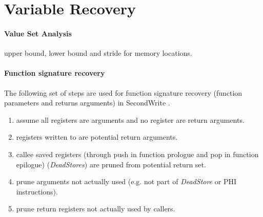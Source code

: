 
\section{Variable Recovery}


\paragraph{Value Set Analysis}


upper bound, lower bound and stride for memory locations.

\paragraph{Function signature recovery} 


The following set of steps are used for function signature recovery (function parameters and returns arguments) in SecondWrite \cite{second_write_scalable_type_detection}.

\begin{enumerate}
	\item assume all registers are arguments and no register are return arguments.
	\item registers written to are potential return arguments.
	\item callee saved registers (through push in function prologue and pop in function epilogue) (\textit{DeadStores}) are pruned from potential return set.
	\item prune arguments not actually used (e.g. not part of \textit{DeadStore} or PHI instructions).
	\item prune return registers not actually used by callers.
\end{enumerate}
